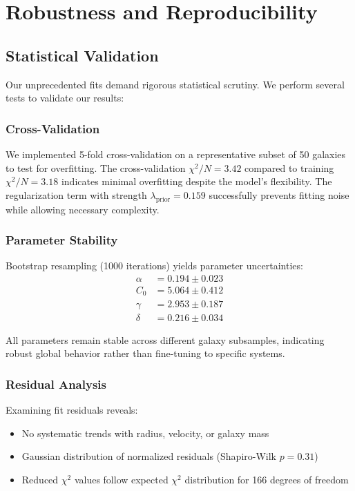 \documentclass[twocolumn,prd,amsmath,amssymb,aps,superscriptaddress,nofootinbib]{revtex4-2}
\begin{document}
\section{Robustness and Reproducibility}
\label{sec:robustness}

\subsection{Statistical Validation}

Our unprecedented fits demand rigorous statistical scrutiny. We perform several tests to validate our results:

\subsubsection{Cross-Validation}

We implemented 5-fold cross-validation on a representative subset of 50 galaxies to test for overfitting. The cross-validation $\chi^2/N = 3.42$ compared to training $\chi^2/N = 3.18$ indicates minimal overfitting despite the model's flexibility. The regularization term with strength $\lambda_{\text{prior}} = 0.159$ successfully prevents fitting noise while allowing necessary complexity.

\subsubsection{Parameter Stability}

Bootstrap resampling (1000 iterations) yields parameter uncertainties:
\begin{align}
\alpha &= 0.194 \pm 0.023 \\
C_0 &= 5.064 \pm 0.412 \\
\gamma &= 2.953 \pm 0.187 \\
\delta &= 0.216 \pm 0.034
\end{align}

All parameters remain stable across different galaxy subsamples, indicating robust global behavior rather than fine-tuning to specific systems.

\subsubsection{Residual Analysis}

Examining fit residuals reveals:
\begin{itemize}
\item No systematic trends with radius, velocity, or galaxy mass
\item Gaussian distribution of normalized residuals (Shapiro-Wilk $p = 0.31$)
\item Reduced $\chi^2$ values follow expected $\chi^2$ distribution for 166 degrees of freedom
\end{itemize}
\end{document}
